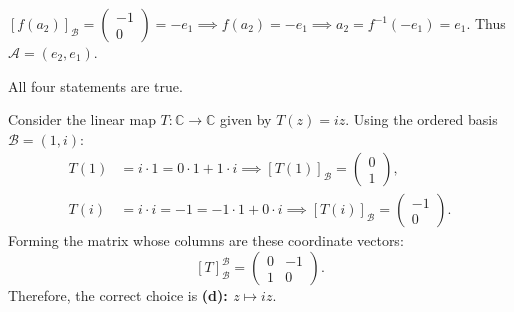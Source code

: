 \begin{exercisesolution*}
\begin{enumerate}[label=\textbf{(\alph*)}]
    $[f(a_2)]_{\mathcal{B}} = \left(\begin{smallmatrix} -1 \\ 0 \end{smallmatrix}\right) = -e_1 \implies f(a_2) = -e_1 \implies a_2 = f^{-1}(-e_1) = e_1$.
    Thus $\mathcal{A} = (e_2, e_1)$.
\end{enumerate}
All four statements are true.
\end{exercisesolution*}

\begin{exercisesolution*}
\label{sol:complex_multiplication_real_linear_map_sc}
Consider the linear map $T \colon \mathbb{C} \to \mathbb{C}$ given by $T(z) = iz$.
Using the ordered basis $\mathcal{B} = (1, i)$:
\begin{align*}
T(1) &= i \cdot 1 = 0 \cdot 1 + 1 \cdot i \implies [T(1)]_{\mathcal{B}} = \begin{pmatrix} 0 \\ 1 \end{pmatrix}, \\
T(i) &= i \cdot i = -1 = -1 \cdot 1 + 0 \cdot i \implies [T(i)]_{\mathcal{B}} = \begin{pmatrix} -1 \\ 0 \end{pmatrix}.
\end{align*}
Forming the matrix whose columns are these coordinate vectors:
\[
[T]_{\mathcal{B}}^{\mathcal{B}} = \begin{pmatrix} 0 & -1 \\ 1 & 0 \end{pmatrix}.
\]
Therefore, the correct choice is \textbf{(d): $z \mapsto iz$}.
\end{exercisesolution*}

